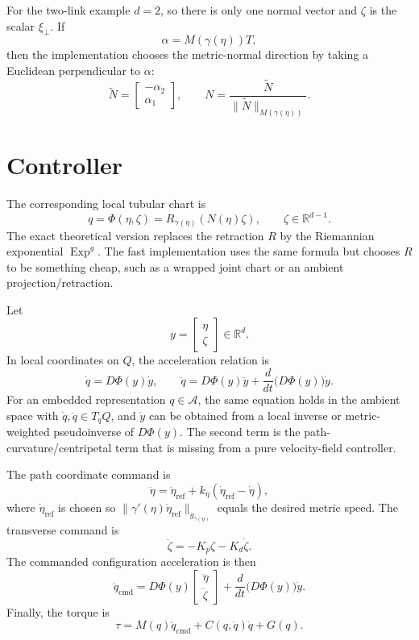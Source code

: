 \documentclass[11pt]{article}
\begin{document}
For the two-link example \(d=2\), so there is only one normal vector and
\(\zeta\) is the scalar \(\xi_\perp\).  If
\[
    \alpha = M(\gamma(\eta))T,
\]
then the implementation chooses the metric-normal direction by taking a
Euclidean perpendicular to \(\alpha\):
\[
    \tilde N =
    \begin{bmatrix}
        -\alpha_2 \\
        \alpha_1
    \end{bmatrix},
    \qquad
    N =
    \frac{\tilde N}{\|\tilde N\|_{M(\gamma(\eta))}}.
\]

\section{Controller}

The corresponding local tubular chart is
\[
    q = \Phi(\eta,\zeta)
      =
      R_{\gamma(\eta)}
      \left(
          N(\eta)\zeta
      \right),
    \qquad
    \zeta\in\mathbb R^{d-1}.
\]
The exact theoretical version replaces the retraction \(R\) by the Riemannian
exponential \(\operatorname{Exp}^g\).  The fast implementation uses the same
formula but chooses \(R\) to be something cheap, such as a wrapped joint chart
or an ambient projection/retraction.

Let
\[
    y =
    \begin{bmatrix}
        \eta \\
        \zeta
    \end{bmatrix}
    \in \mathbb R^d.
\]
In local coordinates on \(Q\), the acceleration relation is
\[
    \dot q = D\Phi(y)\dot y,
    \qquad
    \ddot q =
    D\Phi(y)\ddot y
    +
    \frac{d}{dt}\bigl(D\Phi(y)\bigr)\dot y.
\]
For an embedded representation \(q\in\mathcal A\), the same equation holds in
the ambient space with \(\dot q,\ddot q\in T_qQ\), and \(\dot y\) can be
obtained from a local inverse or metric-weighted pseudoinverse of \(D\Phi(y)\).
The second term is the path-curvature/centripetal term that is missing from a
pure velocity-field controller.

The path coordinate command is
\[
    \ddot \eta
    =
    \ddot \eta_{\mathrm{ref}}
    +
    k_\eta(\dot\eta_{\mathrm{ref}}-\dot\eta),
\]
where \(\dot\eta_{\mathrm{ref}}\) is chosen so
\(\|\gamma'(\eta)\dot\eta_{\mathrm{ref}}\|_{g_{\gamma(\eta)}}\) equals the
desired metric speed.  The transverse command is
\[
    \ddot \zeta
    =
    -K_p \zeta - K_d \dot\zeta.
\]
The commanded configuration acceleration is then
\[
    \ddot q_{\mathrm{cmd}}
    =
    D\Phi(y)
    \begin{bmatrix}
        \ddot\eta \\
        \ddot\zeta
    \end{bmatrix}
    +
    \frac{d}{dt}\bigl(D\Phi(y)\bigr)\dot y.
\]
Finally, the torque is
\[
    \tau
    =
    M(q)\ddot q_{\mathrm{cmd}}
    +
    C(q,\dot q)\dot q
    +
    G(q).
\]
\end{document}
